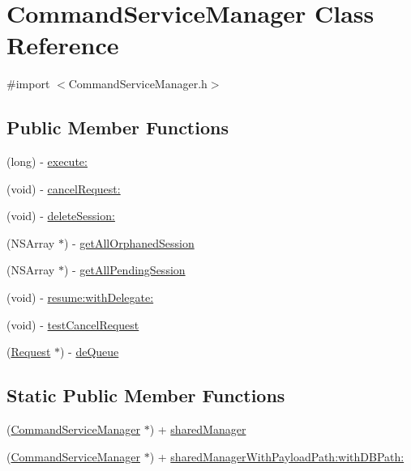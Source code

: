 \hypertarget{interface_command_service_manager}{
\section{CommandServiceManager Class Reference}
\label{interface_command_service_manager}
}


{\ttfamily \#import $<$CommandServiceManager.h$>$}

\subsection*{Public Member Functions}
\begin{DoxyCompactItemize}
\item 
(long) -\/ \hyperlink{interface_command_service_manager_af47dff2aa93a04edc38ce783bb0bcc64}{execute:}
\item 
(void) -\/ \hyperlink{interface_command_service_manager_a14bad68c299dcec24925f8a21c6155ca}{cancelRequest:}
\item 
(void) -\/ \hyperlink{interface_command_service_manager_a1cc62e871aefb4c0a07fbd92a7463e6b}{deleteSession:}
\item 
(NSArray $\ast$) -\/ \hyperlink{interface_command_service_manager_a453bcb0bbfbdfa7b7fb86c395443bc7c}{getAllOrphanedSession}
\item 
(NSArray $\ast$) -\/ \hyperlink{interface_command_service_manager_af5f1b4c870d88b81cf49bed3bb48753b}{getAllPendingSession}
\item 
(void) -\/ \hyperlink{interface_command_service_manager_aaaf717b91f26a94b5f672742dd45200b}{resume:withDelegate:}
\item 
(void) -\/ \hyperlink{interface_command_service_manager_a8b168a833d86a82cbff12a5c9fbde7c8}{testCancelRequest}
\item 
(\hyperlink{interface_request}{Request} $\ast$) -\/ \hyperlink{interface_command_service_manager_af6e2ec735906e0993b23449f0f1cf1a0}{deQueue}
\end{DoxyCompactItemize}
\subsection*{Static Public Member Functions}
\begin{DoxyCompactItemize}
\item 
(\hyperlink{interface_command_service_manager}{CommandServiceManager} $\ast$) + \hyperlink{interface_command_service_manager_a5308ace3c404c5b655ed1a08f3645553}{sharedManager}
\item 
(\hyperlink{interface_command_service_manager}{CommandServiceManager} $\ast$) + \hyperlink{interface_command_service_manager_a946db9813ede4ed57884afdd5bb49415}{sharedManagerWithPayloadPath:withDBPath:}
\end{DoxyCompactItemize}

